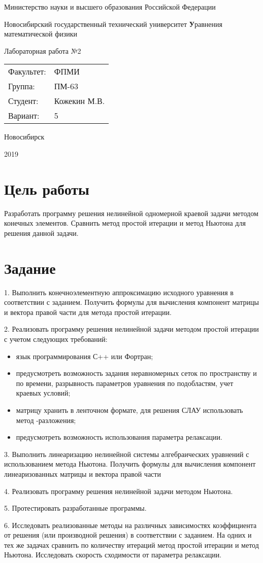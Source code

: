 \documentclass[12pt, a4paper]{article}
\newcommand{\insertTitle}[6]{
\begin{titlepage}
	\begin{center}
    	\large
		Министерство науки и высшего образования Российской Федерации
		
		Новосибирский государственный технический университет
		\vfill
		{\textbf #1}
		
		Лабораторная работа №#2
		\vfill
	\end{center}
	
	\begin{tabular}{ m{7em}  m{7em} }
	Факультет: & ФПМИ \\ 
	Группа: & #3 \\  
	Студент: & #4 \\
	Вариант: & #5
	\end{tabular}
	\vfill

\begin{center}
Новосибирск

#6
\end{center}
\end{titlepage}
}
\begin{document}
\setlength{\abovedisplayskip}{0.1pt}
\setlength{\belowdisplayskip}{0.1pt}

\insertTitle{Уравнения математической физики}{2}{ПМ-63}{Кожекин М.В.}{5}{2019}


\section{Цель работы}
Разработать программу решения нелинейной одномерной краевой задачи методом конечных элементов. Сравнить метод простой итерации и метод Ньютона для решения данной задачи.


\section{Задание}
1.	Выполнить конечноэлементную аппроксимацию исходного уравнения в соответствии с заданием. Получить формулы для вычисления компонент матрицы   и вектора правой части   для метода простой итерации. 

2.	Реализовать программу решения нелинейной задачи методом простой итерации с учетом следующих требований:
\begin{itemize}[noitemsep]
\item язык программирования С++ или Фортран;
\item предусмотреть возможность задания неравномерных сеток по пространству и  по времени, разрывность параметров уравнения по подобластям, учет краевых условий;
\item матрицу хранить в ленточном формате, для решения СЛАУ использовать метод  -разложения;
\item предусмотреть возможность использования параметра релаксации.
\end{itemize}

3.	Выполнить линеаризацию нелинейной системы алгебраических уравнений с использованием метода Ньютона. Получить формулы для вычисления компонент линеаризованных матрицы   и вектора правой части  

4.	Реализовать программу решения нелинейной задачи методом Ньютона.

5.	Протестировать разработанные программы.

6.	Исследовать реализованные методы на различных зависимостях коэффициента от решения (или производной решения) в соответствии с заданием. На одних и тех же задачах сравнить по количеству итераций метод простой итерации и метод Ньютона. Исследовать скорость сходимости от параметра релаксации.
\end{document}
